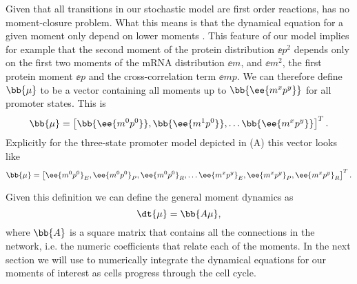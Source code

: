 Given that all transitions in our stochastic model are first order reactions,
 has no moment-closure problem. What this means is that the
dynamical equation for a given moment only depend on lower moments . This feature of our model implies for example that
the second moment of the protein distribution $\ee{p^2}$ depends only on the
first two moments of the mRNA distribution $\ee{m}$, and $\ee{m^2}$, the first
protein moment $\ee{p}$  and the cross-correlation term $\ee{mp}$. We can
therefore define $\bb{\mu}$ to be a vector containing all moments up to
$\bb{\ee{m^x p^y}}$ for all promoter states. This is
\begin{equation}
\bb{\mu} = \left[ \bb{\ee{m^0 p^0}},
								  \bb{\ee{m^1 p^0}},
									\ldots \bb{\ee{m^x p^y}} \right]^T.
\end{equation}
Explicitly for the three-state promoter model depicted in
(A) this vector looks like
\begin{equation}
	\bb{\mu} = \left[ \ee{m^0 p^0}_E, \ee{m^0 p^0}_P, \ee{m^0 p^0}_R, \ldots
                 \ee{m^x p^y}_E, \ee{m^x p^y}_P, \ee{m^x p^y}_R \right]^T.
\end{equation}

Given this definition we can define the general moment dynamics as
\begin{equation}
\dt{\mu} = \bb{A \mu},
\label{eq_mom_dynamics}
\end{equation}
where $\bb{A}$ is a square matrix that contains all the connections in the
network, i.e. the numeric coefficients that relate each of the moments. In the
next section we will use  to numerically integrate the
dynamical equations for our moments of interest as cells progress through the
cell cycle.

